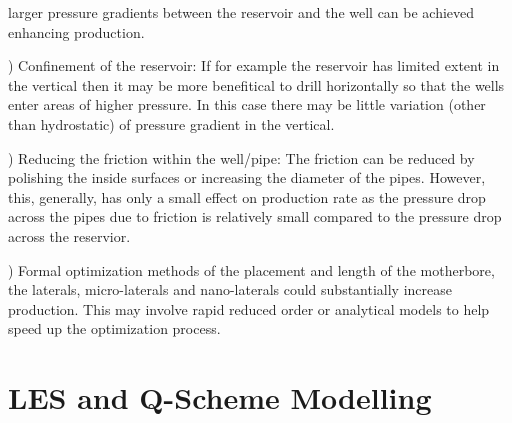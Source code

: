 larger pressure gradients between the reservoir and the well can be achieved enhancing production.
\par{}) Confinement of the reservoir: If for example the reservoir has limited extent in the
vertical then it may be more benefitical to drill horizontally so that the wells enter
areas of higher pressure. In this case there may be little variation (other than hydrostatic)
of pressure gradient in the vertical.
\par{}) Reducing the friction within the well/pipe: The friction can be reduced by polishing the
inside surfaces or increasing the diameter of the pipes. However, this, generally, has only a
small effect on production rate as the pressure drop across the pipes due to friction is
relatively small compared to the pressure drop across the reservior.
\par{}) Formal optimization methods of the placement and length of the motherbore, the laterals,
micro-laterals and nano-laterals could substantially increase production. This may involve
rapid reduced order or analytical models to help speed up the optimization process.


\pagebreak




\section{LES and Q-Scheme Modelling}
\label{LES and Q-Scheme Modelling}



